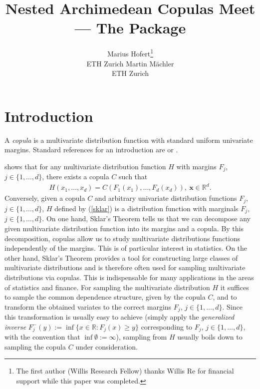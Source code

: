 \documentclass[nojss,article]{jss}
\author{Marius Hofert\thanks{The first author (Willis Research Fellow) thanks
Willis Re for financial support while this paper was completed.} \\ETH Zurich
 \And
 Martin M\"achler \\ ETH Zurich}
\title{Nested Archimedean Copulas Meet \R --- The \pkg{nacopula} Package}
\theoremstyle{mythmstyle}
\newcommand*{\IR}{\mathbb{R}}
\newcommand*{\textcite}[2][]{\citet[#1]{#2}}
\begin{document}
\section{Introduction}
A \textit{copula} is a multivariate distribution function with standard
uniform univariate margins. Standard references for an introduction
are \textcite{joe1997} or \textcite{nelsen2007}.

\textcite{sklar1959} shows that for any multivariate
distribution function $H$ with margins $F_j$, $j\in\{1,\dots,d\}$, there exists
a copula $C$ such that
\begin{align}
	H(x_1,\dots,x_d)=C(F_1(x_1),\dots,F_d(x_d)),\ \bm{x}\in\IR^d.\label{sklar}
\end{align}
Conversely, given a copula $C$ and arbitrary univariate distribution functions $F_j$,
$j\in\{1,\dots,d\}$, $H$ defined by (\ref{sklar}) is a distribution function
with marginals $F_j$, $j\in\{1,\dots,d\}$. On one hand, Sklar's Theorem
tells us that we can decompose any given multivariate distribution function into
its margins and a copula. By this decomposition, copulas allow us to study
multivariate distributions functions independently of the margins. This is of
particular interest in statistics. On the other hand, Sklar's Theorem provides a
tool for constructing large classes of multivariate distributions and is
therefore often used for sampling multivariate distributions via
copulas. This is indispensable for
many applications in the areas of statistics and finance. For sampling the
multivariate distribution $H$ it suffices to sample the common dependence
structure, given by the copula $C$, and to transform the obtained variates to
the correct margins $F_j$, $j\in\{1,\dots,d\}$. Since this transformation is
usually easy to achieve (simply apply the \textit{generalized inverse}
$F_j^-(y):=\inf\{x\in\IR:F_j(x)\ge y\}$ corresponding to $F_j$,
$j\in\{1,\dots,d\}$, with the convention that $\inf\emptyset:=\infty$), sampling
from $H$ usually boils down to sampling the copula $C$ under consideration.
\end{document}
